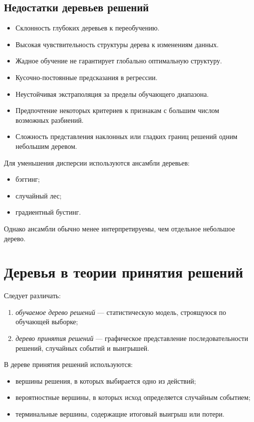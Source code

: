 \documentclass[12pt,a4paper]{article}
\theoremstyle{plain}
\theoremstyle{definition}
\theoremstyle{remark}
\begin{document}
\subsection{Недостатки деревьев решений}

\begin{itemize}
    \item Склонность глубоких деревьев к переобучению.
    \item Высокая чувствительность структуры дерева к изменениям данных.
    \item Жадное обучение не гарантирует глобально оптимальную структуру.
    \item Кусочно-постоянные предсказания в регрессии.
    \item Неустойчивая экстраполяция за пределы обучающего диапазона.
    \item Предпочтение некоторых критериев к признакам с большим числом
    возможных разбиений.
    \item Сложность представления наклонных или гладких границ решений
    одним небольшим деревом.
\end{itemize}

Для уменьшения дисперсии используются ансамбли деревьев:
\begin{itemize}
    \item бэггинг;
    \item случайный лес;
    \item градиентный бустинг.
\end{itemize}
Однако ансамбли обычно менее интерпретируемы, чем отдельное небольшое
дерево.

\section{Деревья в теории принятия решений}

Следует различать:
\begin{enumerate}
    \item \emph{обучаемое дерево решений} --- статистическую модель,
    строящуюся по обучающей выборке;
    \item \emph{дерево принятия решений} --- графическое представление
    последовательности решений, случайных событий и выигрышей.
\end{enumerate}

В дереве принятия решений используются:
\begin{itemize}
    \item вершины решения, в которых выбирается одно из действий;
    \item вероятностные вершины, в которых исход определяется случайным
    событием;
    \item терминальные вершины, содержащие итоговый выигрыш или потери.
\end{itemize}
\end{document}

